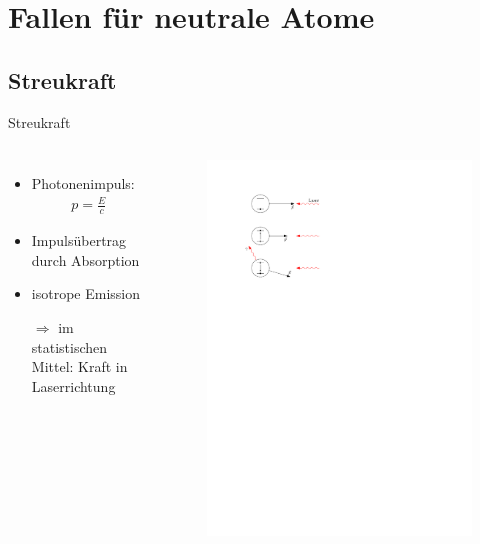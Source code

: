 \documentclass[12pt,xcolor=dvipsnames,professionalfonts]{beamer}
\begin{document}
\section{Fallen für neutrale Atome}
\frame{\tableofcontents[currentsection]}

\subsection{Streukraft}
\begin{frame}{Streukraft}
	\begin{columns}[c]
		\begin{itemize}
			\setlength\itemsep{1em}
			\item Photonenimpuls:
			\begin{align*}
				p = \frac{E}{c}
			\end{align*}
			\item Impulsübertrag durch Absorption
			
			\item isotrope Emission
			
			\item[$\Rightarrow$] im statistischen Mittel: Kraft in Laserrichtung
		\end{itemize}
		
		\begin{figure}[h]
			\centering
			\vspace{-1cm}
			\includegraphics[width=1.0\textwidth]{./figures/streukraft.pdf}
		\end{figure}
		

\end{columns}
\end{frame}
\end{document}
